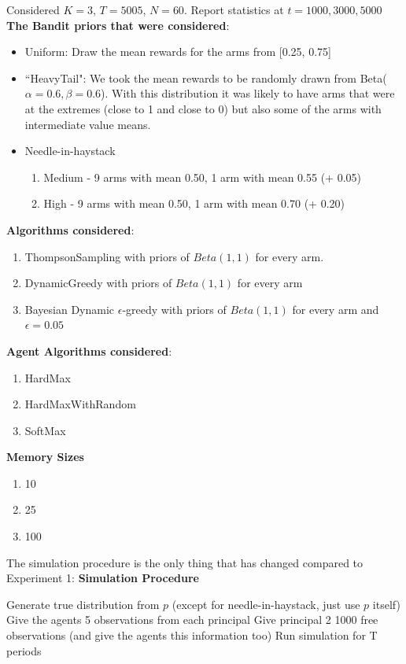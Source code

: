 \documentclass[11pt,letterpaper]{article}
\begin{document}
Considered $K = 3$, $T = 5005$, $N = 60$. Report statistics at $t = 1000, 3000, 5000$ \\
\textbf{The Bandit priors that were considered}:
\begin{itemize}
\item Uniform: Draw the mean rewards for the arms from [0.25, 0.75]
\item ``HeavyTail": We took the mean rewards to be randomly drawn from Beta($\alpha=0.6,\beta=0.6$). With this distribution it was likely to have arms that were at the extremes (close to 1 and close to 0) but also some of the arms with intermediate value means.
\item Needle-in-haystack
\begin{enumerate}
\item Medium - 9 arms with mean 0.50, 1 arm with mean 0.55 (+ 0.05)
\item High - 9 arms with mean 0.50, 1 arm with mean 0.70 (+ 0.20)
\end{enumerate}
\end{itemize}
\textbf{Algorithms considered}:
\begin{enumerate}
\item ThompsonSampling with priors of $Beta(1, 1)$ for every arm.
\item DynamicGreedy with priors of $Beta(1, 1)$ for every arm
\item Bayesian Dynamic $\epsilon$-greedy with priors of $Beta(1, 1)$ for every arm and $\epsilon=0.05$
\end{enumerate}
\textbf{Agent Algorithms considered}:
\begin{enumerate}
\item HardMax
\item HardMaxWithRandom
\item SoftMax
\end{enumerate}
\textbf{Memory Sizes}
\begin{enumerate}
\item 10
\item 25
\item 100
\end{enumerate}

The simulation procedure is the only thing that has changed compared to Experiment 1:
\textbf{Simulation Procedure}
\begin{algorithm}
\begin{algorithmic}[1]
				\State Generate true distribution from $p$ (except for needle-in-haystack, just use $p$ itself)
				\State Give the agents 5 observations from each principal
				\State Give principal 2 1000 free observations (and give the agents this information too)
				\State Run simulation for T periods
			\EndFor
		\EndFor
	\EndFor
\EndFor
\end{algorithmic}
\end{algorithm}
\end{document}
